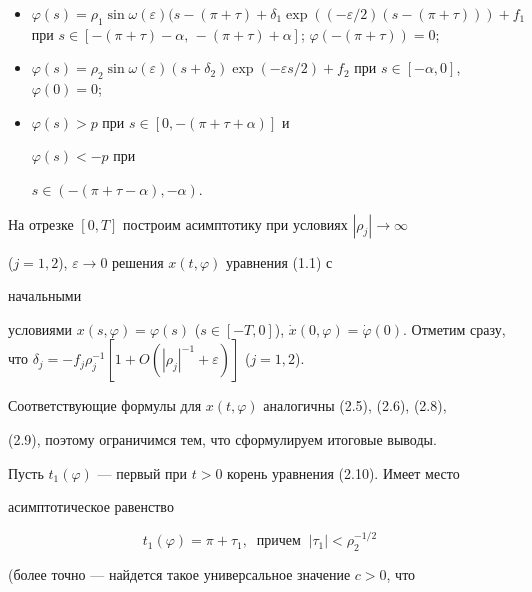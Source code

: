 \begin{itemize}


\item[1)]


$\varphi(s)=\rho_1\sin\omega(\varepsilon)(s-(\pi+\tau)+\delta_1


\exp((-\varepsilon /2)(s-(\pi+\tau)))+f_1$ при $s\in[-(\pi+\tau)-\alpha,\,


-(\pi+\tau)+\alpha]$; $\varphi(-(\pi+\tau))=0$;


\item[2)] $\varphi(s)=\rho_2\sin\omega(\varepsilon)(s+\delta_2)


\exp(- \varepsilon s/2)+f_2$ при $s\in[-\alpha,0]$, $\varphi(0)=0$;


\item[3)] $\varphi(s)>p$ при $s\in[0,-(\pi+\tau+\alpha)]$ и


$\varphi(s)<-p$ при


$s\in(-(\pi+\tau-\alpha),-\alpha)$.


\end{itemize}





На отрезке $[0,T]$ построим асимптотику при условиях $|\rho_j|\to\infty$


($j=1,2$), $\varepsilon\to0$ решения $x(t,\varphi)$ уравнения (1.1) с


начальными


условиями $x(s,\varphi)=\varphi(s)$ ($s\in[-T,0]$), $\Dot x(0,\varphi)=


\Dot\varphi(0)$. Отметим сразу, что $\delta_j=-f_j\rho_j^{-1}[1+


O(|\rho_j|^{-1}+\varepsilon)]$ ($j=1,2$).





Соответствующие формулы для $x(t,\varphi)$ аналогичны (2.5), (2.6), (2.8),


(2.9), поэтому ограничимся тем, что сформулируем итоговые выводы.





Пусть $t_1(\varphi)$ --- первый при $t>0$ корень уравнения (2.10). Имеет место


асимптотическое равенство


$$


t_1(\varphi)=\pi+\tau_1, \ \text{ причем }\ |\tau_1|<\rho_2^{-1/2}


$$


(более точно --- найдется такое универсальное значение $c>0$, что


